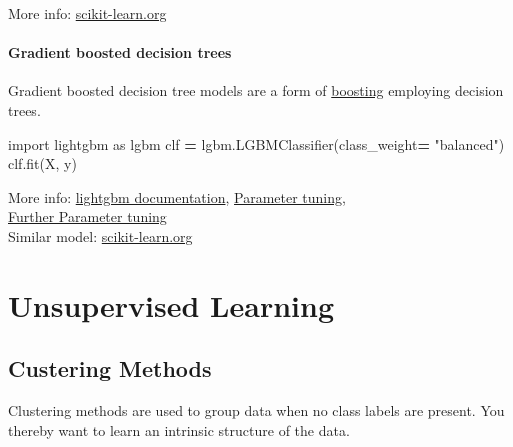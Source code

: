 \documentclass[
]{book}
\newenvironment{Shaded}{\begin{snugshade}}{\end{snugshade}}
\newcommand{\ImportTok}[1]{#1}
\newcommand{\NormalTok}[1]{#1}
\newcommand{\OperatorTok}[1]{\textcolor[rgb]{0.81,0.36,0.00}{\textbf{#1}}}
\newcommand{\StringTok}[1]{\textcolor[rgb]{0.31,0.60,0.02}{#1}}
\begin{document}
More info:
\href{https://scikit-learn.org/stable/modules/generated/sklearn.ensemble.RandomForestClassifier.html}{scikit-learn.org}\\

\hypertarget{gradient-boosted-decision-trees}{%
\subsubsection{Gradient boosted decision trees}\label{gradient-boosted-decision-trees}}

Gradient boosted decision tree models are a form of
\protect\hyperlink{boosting}{boosting} employing decision trees.

\begin{Shaded}
\begin{Highlighting}[]
\ImportTok{import}\NormalTok{ lightgbm }\ImportTok{as}\NormalTok{ lgbm}
\NormalTok{clf }\OperatorTok{=}\NormalTok{ lgbm.LGBMClassifier(class\_weight}\OperatorTok{=} \StringTok{"balanced"}\NormalTok{)}
\NormalTok{clf.fit(X, y)}
\end{Highlighting}
\end{Shaded}

More info: \href{https://lightgbm.readthedocs.io/en/latest/pythonapi/lightgbm.LGBMClassifier.html\#lightgbm-lgbmclassifier}{lightgbm
documentation},
\href{https://lightgbm.readthedocs.io/en/latest/Parameters-Tuning.html}{Parameter
tuning},\\
\href{https://neptune.ai/blog/lightgbm-parameters-guide}{Further Parameter
tuning}\\
Similar model:
\href{https://scikit-learn.org/stable/modules/generated/sklearn.ensemble.GradientBoostingClassifier.html}{scikit-learn.org}\\

\hypertarget{unsupervised-learning}{%
\chapter{Unsupervised Learning}\label{unsupervised-learning}}

\hypertarget{custering-methods}{%
\section{Custering Methods}\label{custering-methods}}

Clustering methods are used to group data when no class labels are
present. You thereby want to learn an intrinsic structure of the data.
\end{document}

